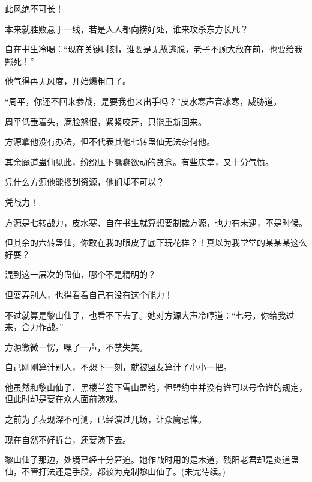 \begin{this_body}
此风绝不可长！

本来就胜败悬于一线，若是人人都向捞好处，谁来攻杀东方长凡？

自在书生冷喝：“现在关键时刻，谁要是无故逃脱，老子不顾大敌在前，也要给我照死！”

他气得再无风度，开始爆粗口了。

“周平，你还不回来参战，是要我也来出手吗？”皮水寒声音冰寒，威胁道。

周平低垂着头，满脸怒恨，紧紧咬牙，只能重新回来。

方源拿他没有办法，但不代表其他七转蛊仙无法奈何他。

其余魔道蛊仙见此，纷纷压下蠢蠢欲动的贪念。有些庆幸，又十分气愤。

凭什么方源他能搜刮资源，他们却不可以？

凭战力！

方源是七转战力，皮水寒、自在书生就算想要制裁方源，也力有未逮，不是时候。

但其余的六转蛊仙，你敢在我的眼皮子底下玩花样？！真以为我堂堂的某某某这么好耍？

混到这一层次的蛊仙，哪个不是精明的？

但耍弄别人，也得看看自己有没有这个能力！

不过就算是黎山仙子，也看不下去了。她对方源大声冷哼道：“七号，你给我过来，合力作战。”

方源微微一愣，嘿了一声，不禁失笑。

自己刚刚算计别人，不想下一刻，就被盟友算计了小小一把。

他虽然和黎山仙子、黑楼兰签下雪山盟约，但盟约中并没有谁可以号令谁的规定，但此时却是要在众人面前演戏。

之前为了表现深不可测，已经演过几场，让众魔忌惮。

现在自然不好拆台，还要演下去。

黎山仙子那边，处境已经十分窘迫。她作战时用的是木道，残阳老君却是炎道蛊仙，不管打法还是手段，都较为克制黎山仙子。(未完待续。)

\end{this_body}

